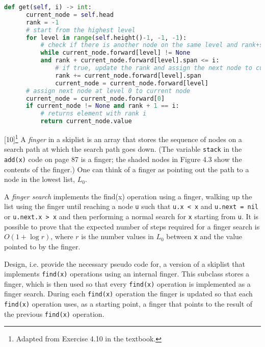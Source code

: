 \documentclass[addpoints]{exam}
\begin{document}
\begin{questions}
\begin{solution}
\begin{lstlisting}[language=Python]
    def get(self, i) -> int:
      current_node = self.head
      rank = -1
      # start from the highest level
      for level in range(self.height()-1, -1, -1):
          # check if there is another node on the same level and rank+span < i           
          while current_node.forward[level] != None         
          and rank + current_node.forward[level].span <= i: 
              # if true, update the rank and assign the next node to current node
              rank += current_node.forward[level].span        
              current_node = current_node.forward[level]     
      # assign next node at level 0 to current node
      current_node = current_node.forward[0]                  
      if current_node != None and rank + 1 == i:
          # returns element with rank i
          return current_node.value                           
      \end{lstlisting}
  \end{solution}

  [10]\footnote{Adapted from Exercise 4.10 in the textbook.}
  A \textit{finger} in a skiplist is an array that stores the sequence of nodes on a search path at which the search path goes down. (The variable \texttt{stack} in the \texttt{add(x)} code on page 87 is a finger; the shaded nodes in Figure 4.3 show the contents of the finger.) One can think of a finger as pointing out the path to a node in the lowest list, $L_0$.

  A \textit{finger search} implements the find(x) operation using a finger, walking up the list using the finger until reaching a node \texttt{u} such that \texttt{u.x < x} and \texttt{u.next = nil} or \texttt{u.next.x > x} and then performing a normal search for \texttt{x} starting from \texttt{u}. It is possible to prove that the expected number of steps required for a finger search is $O(1+\log r)$, where $r$ is the number values in $L_0$ between \texttt{x} and the value pointed to by the finger.

  Design, i.e. provide the necessary pseudo code for, a version of a skiplist that implements \texttt{find(x)} operations using an internal finger. This subclass stores a finger, which is then used so that every \texttt{find(x)} operation is implemented as a finger search. During each \texttt{find(x)} operation the finger is updated so that each \texttt{find(x)} operation uses, as a starting point, a finger that points to the result of the previous \texttt{find(x)} operation.
  \begin{solution}
  \end{solution}


\end{questions}
\end{document}
